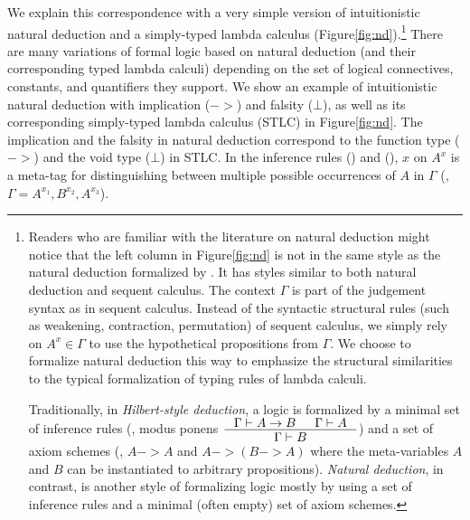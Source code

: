 We explain this correspondence with a very simple
version of intuitionistic natural deduction and
a simply-typed lambda calculus (Figure\;\ref{fig:nd}).\footnote{
        Readers who are familiar with the literature on natural deduction
        might notice that the left column in Figure\;\ref{fig:nd} is not in
        the same style as the natural deduction formalized by
        \citet{Gentzen35,Gentzen69}. It has styles similar to
        both natural deduction and sequent calculus. The context $\Gamma$
        is part of the judgement syntax as in sequent calculus. Instead
        of the syntactic structural rules (such as weakening,
        contraction, permutation) of sequent calculus, we simply rely on
        $A^x \in \Gamma$ to use the hypothetical propositions from $\Gamma$.
        We choose to formalize natural deduction this way to emphasize
        the structural similarities to the typical formalization
        of typing rules of lambda calculi.

	Traditionally, in \emph{Hilbert-style deduction}, a logic is formalized
	by a minimal set of inference rules (\eg, modus ponens
	$\inference{\Gamma |- A -> B & \Gamma |- A}{\Gamma |- B}$)
	and a set of axiom schemes (\eg, $A -> A$ and $A -> (B -> A)$ where
	the meta-variables $A$ and $B$ can be instantiated to arbitrary
	propositions).
	\emph{Natural deduction}, in contrast, is another style of
	formalizing logic mostly by using a set of inference rules and
	a minimal (often empty) set of axiom schemes.
	}
There are many variations of formal logic based on natural deduction
(and their corresponding typed lambda calculi) depending on
the set of logical connectives, constants, and quantifiers they support.
We show an example of intuitionistic natural deduction with
implication ($->$) and falsity ($\bot$), as well as its corresponding
simply-typed lambda calculus (STLC) in Figure\;\ref{fig:nd}.
The implication and the falsity in natural deduction
correspond to the function type ($->$) and the void type ($\bot$) in STLC.
In the inference rules () and (),
$x$ on $A^x$ is a meta-tag for distinguishing between multiple possible
occurrences of $A$ in $\Gamma$ (\eg, $\Gamma = A^{x_1},B^{x_2},A^{x_3}$).

